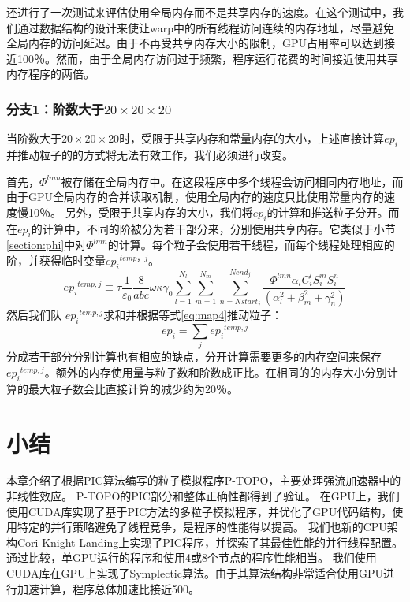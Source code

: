 还进行了一次测试来评估使用全局内存而不是共享内存的速度。在这个测试中，我们通过数据结构的设计来使让warp中的所有线程访问连续的内存地址，尽量避免全局内存的访问延迟。由于不再受共享内存大小的限制，GPU占用率可以达到接近100％。然而，由于全局内存访问过于频繁，程序运行花费的时间接近使用共享内存程序的两倍。

\subsubsection{分支1：阶数大于$20 \times 20 \times 20$}
当阶数大于$20 \times 20 \times 20$时，受限于共享内存和常量内存的大小，上述直接计算$ep_ {i}$并推动粒子的的方式将无法有效工作，我们必须进行改变。

首先，$\Phi^{lmn}$被存储在全局内存中。在这段程序中多个线程会访问相同内存地址，而由于GPU全局内存的合并读取机制，使用全局内存的速度只比使用常量内存的速度慢10％。
另外，受限于共享内存的大小，我们将$ ep_{i} $的计算和推送粒子分开。而在$ ep_{i} $的计算中，不同的阶被分为若干部分来，分别使用共享内存。它类似于小节 \ref{section:phi}中对$\Phi^{lmn}$的计算。每个粒子会使用若干线程，而每个线程处理相应的阶，并获得临时变量${e{{p}_{i}}^{temp，j}}$。
\begin{equation}
{e{{p}_{i}}^{temp,j}}\equiv \tau \frac{1}{{{\varepsilon }_{0}}}\frac{8}{abc}\omega \kappa {{\gamma }_{0}}\sum\limits_{l=1}^{{{N}_{l}}}{\sum\limits_{m=1}^{{{N}_{m}}}{\sum\limits_{n=Nstar{{t}_{j}}}^{Nen{{d}_{j}}}{\frac{\Phi^{lmn}{{\alpha }_{l}}C_{i}^{l}S_{i}^{m}S_{i}^{n}}{(\alpha _{l}^{2}+\beta _{m}^{2}+\gamma _{n}^{2})}}}}
\end{equation}
然后我们队 ${e{{p}_{i}}^{temp,j}}$求和并根据等式\ref{eq:map4}推动粒子：
\begin{equation}
e{{p}_{i}}=\sum\limits_{j}{e{{p}_{i}}^{temp,j}}
\end{equation}
分成若干部分分别计算也有相应的缺点，分开计算需要更多的内存空间来保存${e{{p}_{i}}^{temp,j}}$。额外的内存使用量与粒子数和阶数成正比。在相同的的内存大小分别计算的最大粒子数会比直接计算的减少约为20％。

\section{小结}                            \label{section:Code_conclusion}
本章介绍了根据PIC算法编写的粒子模拟程序P-TOPO，主要处理强流加速器中的非线性效应。
P-TOPO的PIC部分和整体正确性都得到了验证。
在GPU上，我们使用CUDA库实现了基于PIC方法的多粒子模拟程序，并优化了GPU代码结构，使用特定的并行策略避免了线程竞争，是程序的性能得以提高。
我们也新的CPU架构Cori Knight Landing上实现了PIC程序，并探索了其最佳性能的并行线程配置。通过比较，单GPU运行的程序和使用4或8个节点的程序性能相当。
我们使用CUDA库在GPU上实现了Symplectic算法。由于其算法结构非常适合使用GPU进行加速计算，程序总体加速比接近500。

